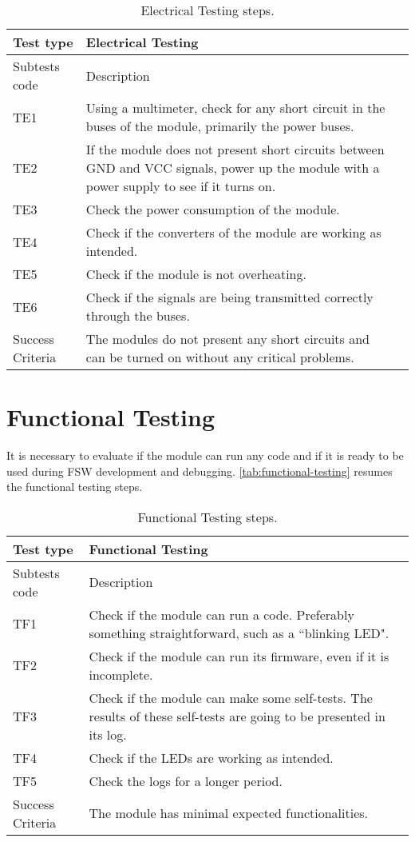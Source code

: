 \begin{table}[!htb]
\centering
\caption{Electrical Testing steps.}
\label{tab:electrical-testing}
\begin{tabular}{m{3cm} m{12cm} m{3cm}}
\toprule
Test type & Electrical Testing \\
\midrule
\midrule
Subtests code & Description \\ 
\midrule
TE1 & Using a multimeter, check for any short circuit in the buses of the module, primarily the power buses. \\
\midrule
TE2 & If the module does not present short circuits between GND and VCC signals, power up the module with a power supply to see if it turns on. \\
\midrule
TE3 & Check the power consumption of the module. \\
\midrule
TE4 & Check if the converters of the module are working as intended. \\
\midrule
TE5 & Check if the module is not overheating. \\
\midrule
TE6 & Check if the signals are being transmitted correctly through the buses. \\
\midrule
\midrule
Success Criteria & The modules do not present any short circuits and can be turned on without any critical problems. \\
\bottomrule
\end{tabular}
\end{table}

\section {Functional Testing}

It is necessary to evaluate if the module can run any code and if it is ready to be used during FSW development and debugging. \autoref{tab:functional-testing} resumes the functional testing steps.

\begin{table}[!htb]
\centering
\caption{Functional Testing steps.}
\label{tab:functional-testing}
\begin{tabular}{m{3cm} m{12cm} m{3cm}}
\toprule
Test type & Functional Testing \\
\midrule
\midrule
Subtests code & Description \\ 
\midrule
TF1 & Check if the module can run a code. Preferably something straightforward, such as a ``blinking LED". \\
\midrule
TF2 & Check if the module can run its firmware, even if it is incomplete. \\
\midrule
TF3 & Check if the module can make some self-tests. The results of these self-tests are going to be presented in its log. \\
\midrule
TF4 & Check if the LEDs are working as intended. \\
\midrule
TF5 & Check the logs for a longer period. \\
\midrule
\midrule
Success Criteria & The module has minimal expected functionalities. \\
\bottomrule
\end{tabular}
\end{table}
 
